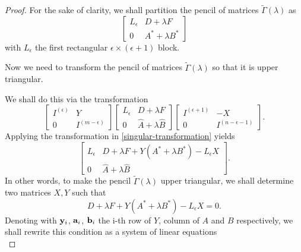 \begin{cs}
\begin{proof}
        For the sake of clarity, we shall partition the pencil of matrices \(\tilde{\Gamma}(\lambda)\) as
        \[
            \begin{bmatrix}
                L_{\epsilon} & D + \lambda F \\
                0 & A^{*} + \lambda B^{*}
            \end{bmatrix}
        \]
        with \(L_{\epsilon}\) the first rectangular \(\epsilon \times (\epsilon + 1)\) block.

        Now we need to transform the pencil of matrices \(\tilde{\Gamma}(\lambda)\) so that it is upper triangular.

        We shall do this via the transformation
        \begin{equation} \label{singular-transformation}
            \begin{bmatrix}
                I^{(\epsilon)} & Y \\
                0 & I^{(m - \epsilon)}
            \end{bmatrix}
            \begin{bmatrix}
                L_{\epsilon} & D + \lambda F \\
                0 & \widehat{A} + \lambda \widehat{B}
            \end{bmatrix}
            \begin{bmatrix}
                I^{(\epsilon + 1)} & -X \\
                0 & I^{(n - \epsilon - 1)}
            \end{bmatrix}.
        \end{equation}
        Applying the transformation in \eqref{singular-transformation} yields
        \[
            \begin{bmatrix}
                L_{\epsilon} & D + \lambda F + Y(A^{*} + \lambda B^{*}) - L_{\epsilon}X \\
                0 & \widehat{A} + \lambda \widehat{B}
            \end{bmatrix}.
        \]
        In other words, to make the pencil \(\tilde{\Gamma}(\lambda)\) upper triangular, we shall determine
        two matrices \(X, Y\) such that
        \[
            D + \lambda F + Y(A^{*} + \lambda B^{*}) - L_{\epsilon}X = 0.
        \]
        Denoting with \(\vb{y}_{i}\), \(\vb{a}_{i}\), \(\vb{b}_{i}\) the i-th row of \(Y\), column of \(A\) and
        \(B\) respectively,
        we shall rewrite this condition as a system of linear equations
        \begin{equation} \label{linear-system-x}

\end{equation}
\end{proof}
\end{cs}
